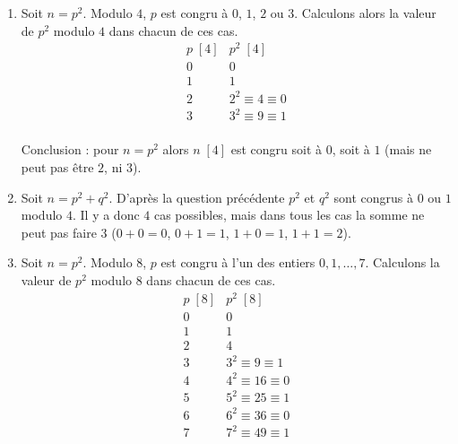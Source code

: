 \documentclass[11pt,class=report,crop=false]{standalone}
\begin{document}
\correction
\sauteligne
\begin{enumerate}
    \item Soit $n=p^2$. 
    Modulo $4$, $p$ est congru à $0$, $1$, $2$ ou $3$.
    Calculons alors la valeur de $p^2$ modulo $4$ dans chacun de ces cas.
    $$
    \begin{array}{c|c}
    p \; [4]  & p^2 \; [4] \\ 
    \hline 
    0 & 0 \\
    1 & 1 \\
    2 & 2^2 \equiv 4 \equiv 0 \\
    3 & 3^2 \equiv 9 \equiv 1 \\
    \end{array}$$   
    
    Conclusion : pour $n=p^2$ alors $n \; [4]$ est congru soit à $0$, soit à $1$ (mais ne peut pas être $2$, ni $3$).
    
%
%
  


   \item Soit $n=p^2+q^2$.
D'après la question précédente $p^2$ et $q^2$ sont congrus à $0$ ou $1$ modulo $4$. Il y a donc $4$ cas possibles, mais dans tous les cas la somme ne peut pas faire $3$ ($0+0=0$, $0+1=1$, $1+0=1$, $1+1=2$).

    \item Soit $n=p^2$. 
Modulo $8$, $p$ est congru à l'un des entiers $0,1,\ldots,7$.
Calculons la valeur de $p^2$ modulo $8$ dans chacun de ces cas.
$$
\begin{array}{c|c}
p \; [8]  & p^2 \; [8] \\ \hline 
0 & 0 \\
1 & 1 \\
2 & 4 \\
3 & 3^2 \equiv 9 \equiv 1 \\
4 & 4^2 \equiv 16 \equiv 0 \\
5 & 5^2 \equiv 25 \equiv 1 \\
6 & 6^2 \equiv 36 \equiv 0 \\
7 & 7^2 \equiv 49 \equiv 1 \\
\end{array}$$   


\end{enumerate}
\end{document}
